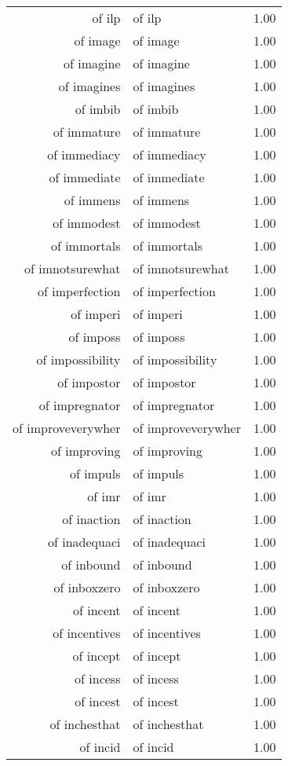 \begin{table}[ht]
\begin{tabular}{rlr}
  of ilp & of ilp & 1.00 \\ 
  of image & of image & 1.00 \\ 
  of imagine & of imagine & 1.00 \\ 
  of imagines & of imagines & 1.00 \\ 
  of imbib & of imbib & 1.00 \\ 
  of immature & of immature & 1.00 \\ 
  of immediacy & of immediacy & 1.00 \\ 
  of immediate & of immediate & 1.00 \\ 
  of immens & of immens & 1.00 \\ 
  of immodest & of immodest & 1.00 \\ 
  of immortals & of immortals & 1.00 \\ 
  of imnotsurewhat & of imnotsurewhat & 1.00 \\ 
  of imperfection & of imperfection & 1.00 \\ 
  of imperi & of imperi & 1.00 \\ 
  of imposs & of imposs & 1.00 \\ 
  of impossibility & of impossibility & 1.00 \\ 
  of impostor & of impostor & 1.00 \\ 
  of impregnator & of impregnator & 1.00 \\ 
  of improveverywher & of improveverywher & 1.00 \\ 
  of improving & of improving & 1.00 \\ 
  of impuls & of impuls & 1.00 \\ 
  of imr & of imr & 1.00 \\ 
  of inaction & of inaction & 1.00 \\ 
  of inadequaci & of inadequaci & 1.00 \\ 
  of inbound & of inbound & 1.00 \\ 
  of inboxzero & of inboxzero & 1.00 \\ 
  of incent & of incent & 1.00 \\ 
  of incentives & of incentives & 1.00 \\ 
  of incept & of incept & 1.00 \\ 
  of incess & of incess & 1.00 \\ 
  of incest & of incest & 1.00 \\ 
  of inchesthat & of inchesthat & 1.00 \\ 
  of incid & of incid & 1.00 \\ 

\end{tabular}
\end{table}
